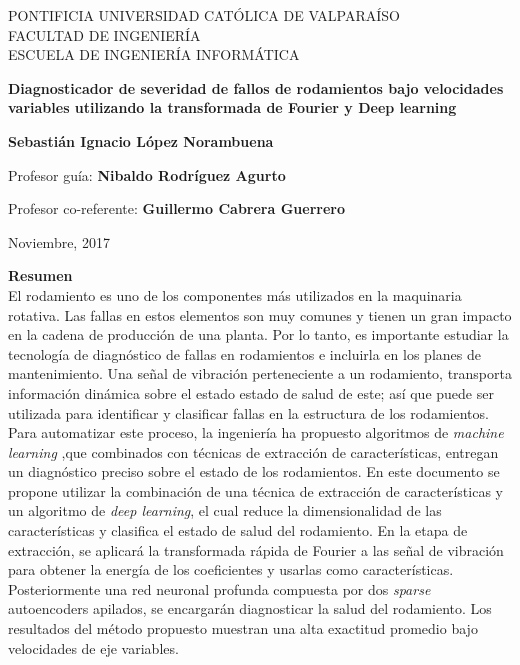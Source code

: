 \documentclass[12pt]{article}%
\begin{document}
\thispagestyle{empty}

\begin{center}
PONTIFICIA UNIVERSIDAD CATÓLICA DE VALPARAÍSO\\
FACULTAD DE INGENIERÍA\\
ESCUELA DE INGENIERÍA INFORMÁTICA\\

\vspace{4cm}

\Large{\textbf{Diagnosticador de severidad de fallos de rodamientos bajo velocidades variables utilizando la transformada de Fourier y Deep learning}}

\vspace{3cm}

\normalsize{\textbf{Sebastián Ignacio López Norambuena}}\\
\end{center}

\vspace{3cm}
\begin{center} 
Profesor guía: \textbf{Nibaldo Rodríguez Agurto}
\end{center}
\begin{center} 
Profesor co-referente: \textbf{Guillermo Cabrera Guerrero}
\end{center}
\vspace{1cm}
\begin{center} 
Noviembre, 2017
\end{center}
\newpage
{}

\noindent
\Large{\textbf{Resumen}}\\

\normalsize
\noindent El rodamiento es uno de los componentes más utilizados en la maquinaria rotativa. Las fallas en estos elementos son muy comunes y tienen un gran impacto en la cadena de producción de una planta. Por lo tanto, es importante estudiar la tecnología de diagnóstico de fallas en rodamientos e incluirla en los planes de mantenimiento. Una señal de vibración perteneciente a un rodamiento, transporta información dinámica sobre el estado estado de salud de este; así que puede ser utilizada para identificar y clasificar fallas en la estructura de los rodamientos. Para automatizar este proceso, la ingeniería ha propuesto algoritmos de \textit{machine learning} ,que combinados con técnicas de extracción de características, entregan un diagnóstico preciso sobre el estado de los rodamientos. En este documento se propone utilizar la combinación de una técnica de extracción de características y un algoritmo de \textit{deep learning}, el cual reduce la dimensionalidad de las características y clasifica el estado de salud del rodamiento. En la etapa de extracción, se aplicará la transformada rápida de Fourier a las señal de vibración para obtener la energía de los coeficientes y usarlas como características. Posteriormente una red neuronal profunda compuesta por dos \textit{sparse} autoencoders apilados, se encargarán diagnosticar la salud del rodamiento. Los resultados del método propuesto muestran una alta exactitud promedio bajo velocidades de eje variables.
\newline
\end{document}

